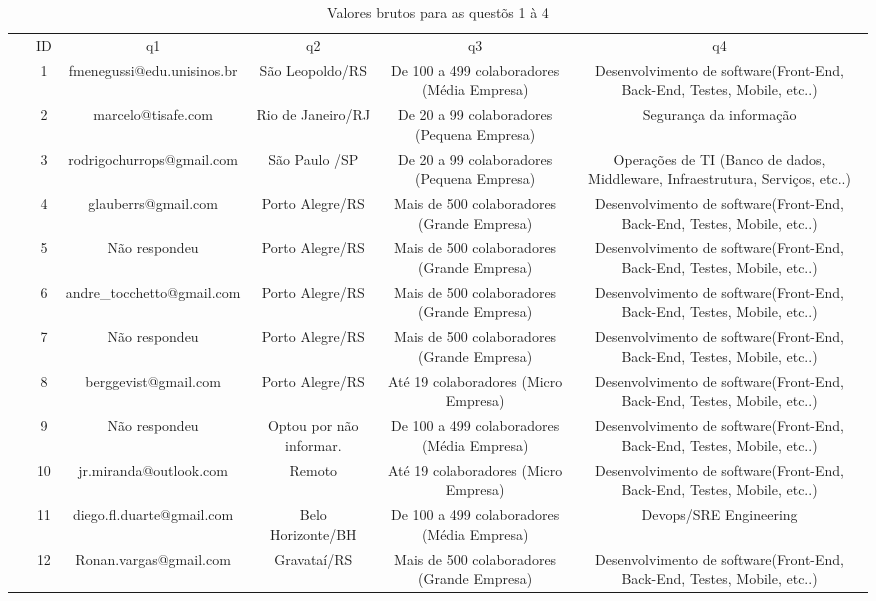 \documentclass[twoside,english,brazilian]{UNISINOSartigo}
\begin{document}
\begin{table}[h]
\tiny
    \caption{Valores brutos para as questõs 1 à 4}
    \begin{tabularx}{\columnwidth}{cccccc}
    \hline
~ & ID & q1 & q2 & q3 & q4 \\
~ & 1 & fmenegussi@edu.unisinos.br & São Leopoldo/RS & De 100 a 499 colaboradores (Média Empresa) & Desenvolvimento de software(Front-End, Back-End, Testes, Mobile, etc..) \\
~ & 2 & marcelo@tisafe.com & Rio de Janeiro/RJ & De 20 a 99 colaboradores (Pequena Empresa) & Segurança da informação \\
~ & 3 & rodrigochurrops@gmail.com & São Paulo /SP & De 20 a 99 colaboradores (Pequena Empresa) & Operações de TI (Banco de dados, Middleware, Infraestrutura, Serviços, etc..) \\
~ & 4 & glauberrs@gmail.com & Porto Alegre/RS & Mais de 500 colaboradores (Grande Empresa) & Desenvolvimento de software(Front-End, Back-End, Testes, Mobile, etc..) \\
~ & 5 & Não respondeu & Porto Alegre/RS & Mais de 500 colaboradores (Grande Empresa) & Desenvolvimento de software(Front-End, Back-End, Testes, Mobile, etc..) \\
~ & 6 & andre_tocchetto@gmail.com & Porto Alegre/RS & Mais de 500 colaboradores (Grande Empresa) & Desenvolvimento de software(Front-End, Back-End, Testes, Mobile, etc..) \\
~ & 7 & Não respondeu & Porto Alegre/RS & Mais de 500 colaboradores (Grande Empresa) & Desenvolvimento de software(Front-End, Back-End, Testes, Mobile, etc..) \\
~ & 8 & berggevist@gmail.com & Porto Alegre/RS & Até 19 colaboradores (Micro Empresa) & Desenvolvimento de software(Front-End, Back-End, Testes, Mobile, etc..) \\
~ & 9 & Não respondeu & Optou por não informar. & De 100 a 499 colaboradores (Média Empresa) & Desenvolvimento de software(Front-End, Back-End, Testes, Mobile, etc..) \\
~ & 10 & jr.miranda@outlook.com  & Remoto  & Até 19 colaboradores (Micro Empresa) & Desenvolvimento de software(Front-End, Back-End, Testes, Mobile, etc..) \\
~ & 11 & diego.fl.duarte@gmail.com & Belo Horizonte/BH & De 100 a 499 colaboradores (Média Empresa) & Devops/SRE Engineering \\
~ & 12 & Ronan.vargas@gmail.com & Gravataí/RS & Mais de 500 colaboradores (Grande Empresa) & Desenvolvimento de software(Front-End, Back-End, Testes, Mobile, etc..) \\

\end{tabularx}
\end{table}
\end{document}
